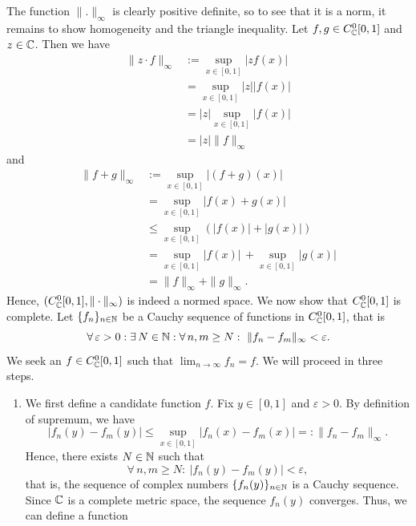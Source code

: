\begin{example}
  The function \(\|.\|_\infty\) is clearly positive definite, so to
  see that it is a norm, it remains to show homogeneity and the
  triangle inequality.
  Let $f,g\in C^0_{\mathbb{C}}[0,1]$ and $z\in \mathbb{C}$. Then we have
  \begin{align}
    \|z\cdot f\|_{\infty}
    &:= \sup_{x\in[0,1]}|zf(x)| \\
    &= \sup_{x\in[0,1]}|z||f(x)| \\
    & =|z|\sup_{x\in[0,1]}|f(x)| \\
    &= |z|\|f\|_{\infty}
  \end{align}
  and
  \begin{align*}
  \|f+g\|_{\infty}
  &:= \sup_{x\in[0,1]}|(f+g)(x)|\\
  &= \sup_{x\in[0,1]}|f(x)+g(x)|\\
  &\leq \sup_{x\in[0,1]}(|f(x)|+|g(x)|)\\
  & = \sup_{x\in[0,1]}|f(x)|\,+\sup_{x\in[0,1]}|g(x)|\\
  & = \|f\|_{\infty}+\|g\|_{\infty}.
  \end{align*}
  Hence, $(C^0_{\mathbb{C}}[0,1],\|\cdot\|_{\infty})$ is indeed a normed space.
  We now show that $C^0_{\mathbb{C}}[0,1]$ is complete. Let $\{f_n\}_{n\in \mathbb{N}}$ be
  a Cauchy sequence of functions in $C^0_{\mathbb{C}}[0,1]$, that is
  \begin{equation*}
    \forall \, \varepsilon > 0 :
    \exists \, N \in \mathbb{N} :
    \forall \, n,m \geq N :
    \ \|f_n-f_m\|_{\infty} <\varepsilon.
  \end{equation*}
  We seek an $f\in C^0_{\mathbb{C}}[0,1]$ such that $\displaystyle
  \lim_{n\to\infty}f_n=f$. We will proceed in three steps.
  \begin{enumerate}
    \item
      We first define a candidate function \(f\).
      Fix $y\in [0,1]$ and $\varepsilon >0$. By definition of supremum, we have
      \begin{equation*}
      |f_n(y) -f_m(y)|
      \leq \sup_{x\in[0,1]}|f_n(x)-f_m(x)|
      =: \|f_n-f_m\|_{\infty}.
      \end{equation*}
      Hence, there exists $N\in \mathbb{N}$ such that
      \begin{equation*}
      \forall \, n,m \geq N : \ |f_n(y) -f_m(y)|<\varepsilon,
      \end{equation*}
      that is, the sequence of complex numbers $\{f_n(y)\}_{n\in \mathbb{N}}$ is a
      Cauchy sequence. Since $\mathbb{C}$ is a complete metric space,
      the sequence \(f_n(y)\) converges. Thus, we can define a function
      \begin{align*}

\end{align*}
\end{enumerate}
\end{example}
